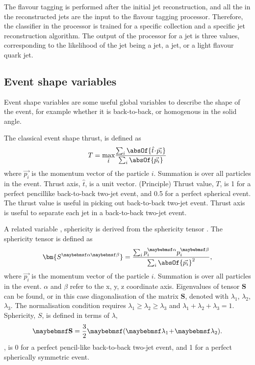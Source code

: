 The flavour tagging is performed after the initial jet reconstruction, and all the \PFOs in the reconstructed jets are the input to the \lcfiplus flavour tagging processor. Therefore, the classifier in the \lcfiplus processor is trained for a specific \PFO collection and a specific jet reconstruction algorithm. The output of the processor for a jet is three values, corresponding to the likelihood of the jet being a \Pbottom jet, a \Pcharm jet, or a light flavour quark jet.



\subsection{Event shape variables}
\label{sec:pandoraEvtShape}

Event shape variables are some useful global variables to describe the shape of the event, for example whether it is back-to-back, or homogenous in the solid angle.

The classical event shape thrust\cite{PhysRevLett.39.1587}, is defined as
\begin{equation}
T = \max_{\hat{t}}\!\frac{\sum_{i}\absOf{\hat{t}\!\cdot\!\vec{p_{i}}}}{\sum_{i}\absOf{\vec{p_{i}}}}
\end{equation}
where $\vec{p_{i}}$ is the momentum vector of the particle $i$. Summation is over all particles in the event. Thrust axis, $\hat{t}$, is a unit vector. (Principle) Thrust value, $T$, is 1 for a perfect pencillike back-to-back two-jet event, and 0.5 for a perfect spherical event. The thrust value is useful in picking out back-to-back two-jet event. Thrust axis is useful to separate each jet in a back-to-back two-jet event.

A related variable , sphericity is  derived from the sphericity tensor \cite{PhysRevLett.35.1609}. The sphericity tensor is  defined as
\begin{equation}
\bm{S^{\alpha\beta}} = \frac{\sum_{i}p^{\alpha}_{i}p^{\beta}_{i}}{\sum_{i}\absOf{\vec{p_{i}}}^2},
\end{equation}
where $\vec{p_{i}}$ is the momentum vector of the particle $i$. Summation is over all particles in the event. $\alpha$ and $\beta$ refer to the x, y, z coordinate axis. Eigenvalues of tensor $\bm{S}$ can be found, or in this case diagonalisation of the matrix $\bm{S}$, denoted with $\lambda_{1}$, $\lambda_{2}$, $\lambda_{3}$. The normalisation condition requires $\lambda_{1}\!\geqslant\! \lambda_{2} \! \geqslant \! \lambda_{3}$ and $ \lambda_{1} \! + \! \lambda_{2} \! + \! \lambda_{3} \! = \! 1 $. Sphericity, $S$, is defined in terms of $\lambda$,
\begin{equation}
\sphericity = \frac{3}{2}\parenths{\lambda_{1} \! + \! \lambda_{2}}.
\end{equation}
\sphericity, is 0 for a perfect pencil-like back-to-back two-jet event, and 1 for a perfect spherically symmetric event.

